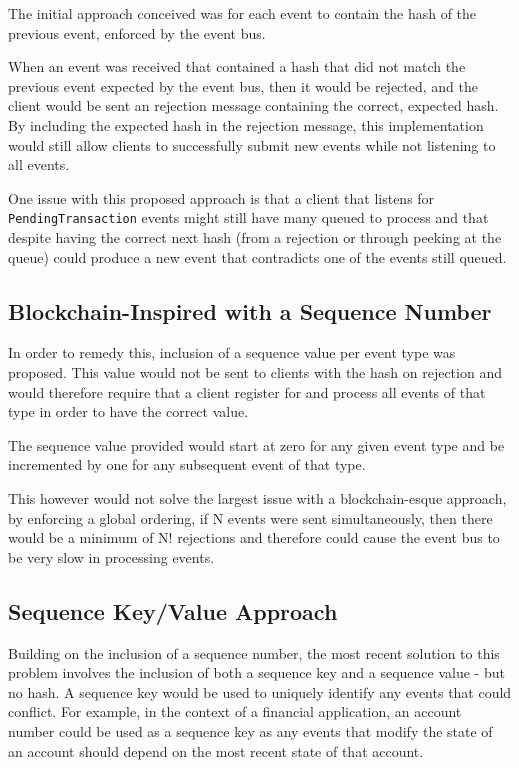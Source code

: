 \documentclass{l3proj}
\begin{document}
The initial approach conceived was for each event to contain the hash of the previous event, enforced by the event bus.



When an event was received that contained a hash that did not match the previous event expected by the event bus, then it would be rejected, and the client would be sent an rejection message containing the correct, expected hash. By including the expected hash in the rejection message, this implementation would still allow clients to successfully submit new events while not listening to all events.

One issue with this proposed approach is that a client that listens for \texttt{PendingTransaction} events might still have many queued to process and that despite having the correct next hash (from a rejection or through peeking at the queue) could produce a new event that contradicts one of the events still queued.

\subsection{Blockchain-Inspired with a Sequence Number}
In order to remedy this, inclusion of a sequence value per event type was proposed. This value would not be sent to clients with the hash on rejection and would therefore require that a client register for and process all events of that type in order to have the correct value.

The sequence value provided would start at zero for any given event type and be incremented by one for any subsequent event of that type.



This however would not solve the largest issue with a blockchain-esque approach, by enforcing a global ordering, if N events were sent simultaneously, then there would be a minimum of N! rejections and therefore could cause the event bus to be very slow in processing events.

\subsection{Sequence Key/Value Approach}
Building on the inclusion of a sequence number, the most recent solution to this problem involves the inclusion of both a sequence key and a sequence value - but no hash. A sequence key would be used to uniquely identify any events that could conflict. For example, in the context of a financial application, an account number could be used as a sequence key as any events that modify the state of an account should depend on the most recent state of that account.
\end{document}
